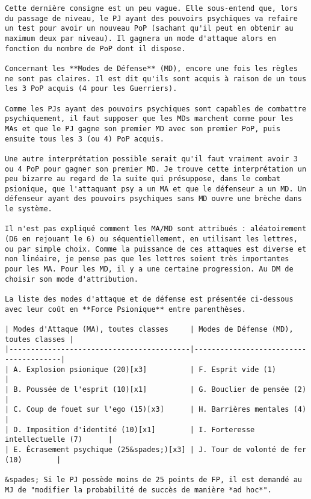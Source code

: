 \documentclass[12pt]{article}
\begin{document}
\begin{verbatim}
Cette dernière consigne est un peu vague. Elle sous-entend que, lors du passage de niveau, le PJ ayant des pouvoirs psychiques va refaire un test pour avoir un nouveau PoP (sachant qu'il peut en obtenir au maximum deux par niveau). Il gagnera un mode d'attaque alors en fonction du nombre de PoP dont il dispose.

Concernant les **Modes de Défense** (MD), encore une fois les règles ne sont pas claires. Il est dit qu'ils sont acquis à raison de un tous les 3 PoP acquis (4 pour les Guerriers).

Comme les PJs ayant des pouvoirs psychiques sont capables de combattre psychiquement, il faut supposer que les MDs marchent comme pour les MAs et que le PJ gagne son premier MD avec son premier PoP, puis ensuite tous les 3 (ou 4) PoP acquis.

Une autre interprétation possible serait qu'il faut vraiment avoir 3 ou 4 PoP pour gagner son premier MD. Je trouve cette interprétation un peu bizarre au regard de la suite qui présuppose, dans le combat psionique, que l'attaquant psy a un MA et que le défenseur a un MD. Un défenseur ayant des pouvoirs psychiques sans MD ouvre une brèche dans le système.

Il n'est pas expliqué comment les MA/MD sont attribués : aléatoirement (D6 en rejouant le 6) ou séquentiellement, en utilisant les lettres, ou par simple choix. Comme la puissance de ces attaques est diverse et non linéaire, je pense pas que les lettres soient très importantes pour les MA. Pour les MD, il y a une certaine progression. Au DM de choisir son mode d'attribution.

La liste des modes d'attaque et de défense est présentée ci-dessous avec leur coût en **Force Psionique** entre parenthèses.

| Modes d'Attaque (MA), toutes classes     | Modes de Défense (MD), toutes classes |
|------------------------------------------|---------------------------------------|
| A. Explosion psionique (20)[x3]          | F. Esprit vide (1)                    |
| B. Poussée de l'esprit (10)[x1]          | G. Bouclier de pensée (2)             |
| C. Coup de fouet sur l'ego (15)[x3]      | H. Barrières mentales (4)             |
| D. Imposition d'identité (10)[x1]        | I. Forteresse intellectuelle (7)      |
| E. Écrasement psychique (25&spades;)[x3] | J. Tour de volonté de fer (10)        |

&spades; Si le PJ possède moins de 25 points de FP, il est demandé au MJ de "modifier la probabilité de succès de manière *ad hoc*".


\end{verbatim}
\end{document}
